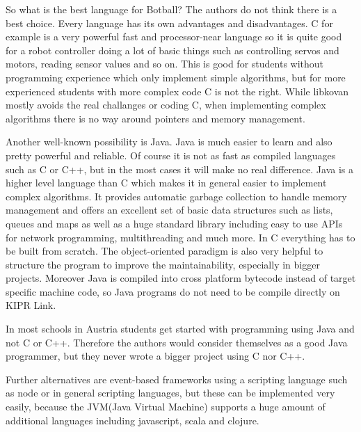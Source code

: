 \documentclass{juniorjournal}
\begin{document}
So what is the best language for Botball\cite{Botball}?
The authors do not think there is a best choice.
Every language has its own advantages and disadvantages.
C for example is a very powerful fast and processor-near language so it is quite good for a robot controller doing a lot of basic things such as controlling servos and motors, reading sensor values and so on. 
This is good for students without programming experience which only implement simple algorithms, but for more experienced students with more complex code C is not the right. 
While libkovan mostly avoids the real challanges or coding C, when implementing complex algorithms there is no way around pointers and memory management.

Another well-known possibility is Java\cite{Java}. 
Java\cite{Java} is much easier to learn and also pretty powerful and reliable.
Of course it is not as fast as compiled languages such as C or C++, but in the most cases it will make no real difference.
Java\cite{Java} is a higher level language than C which makes it in general easier to implement complex algorithms.
It provides automatic garbage collection to handle memory management 
and offers an excellent set of basic data structures such as lists, queues and maps as well as a huge standard library including easy to use APIs for network programming, multithreading and much more.
In C everything has to be built from scratch.
The object-oriented paradigm is also very helpful to structure the program 
to improve the maintainability, especially in bigger projects.
Moreover Java is compiled into cross platform bytecode instead of target specific machine code, so Java programs do not need to be compile directly on KIPR Link.

In most schools in Austria students get started with programming using Java\cite{Java} and not C or C++.
Therefore the authors would consider themselves as a good Java\cite{Java} programmer, 
but they never wrote a bigger project using C nor C++.

Further alternatives are event-based frameworks using a scripting language 
such as node\cite{node} or in general scripting languages, but these can be implemented very easily, 
because the JVM\cite{JVM}(Java\cite{Java} Virtual Machine) supports a huge amount of additional languages 
including javascript, scala and clojure.
\end{document}
